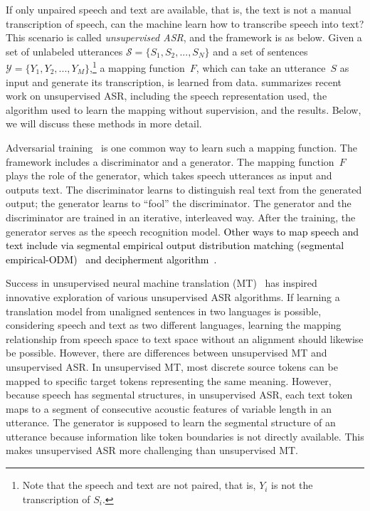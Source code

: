 If only unpaired speech and text are available, that is, the text is not a
manual transcription of speech, can the machine learn how to transcribe speech
into text?
This scenario is called \textit{unsupervised ASR}, and the framework is as
below. 
Given a set of unlabeled utterances $\mathcal{S}=\{S_1, S_2, ..., S_N\}$  and a
set of sentences $\mathcal{Y}=\{Y_1, Y_2, ..., Y_M\}$,\footnote{Note that
the speech and text are not paired, that is, $Y_i$ is not the transcription of
$S_i$.} a mapping function~$F$, which can take an utterance~$S$ as input and
generate its transcription, is learned from data. 
 summarizes recent work on unsupervised ASR,
including the speech representation used, the algorithm used to learn the
mapping without supervision, and the results. Below, we will discuss these
methods in more detail.


Adversarial training~\parencite{goodfellow_generative_2014,arjovsky_wasserstein_2017, gulrajani_improved_2017} is one common way to learn such a 
mapping function. 
The framework includes a discriminator and a generator.
The mapping function~$F$ plays the role of the generator, which takes speech utterances as input and outputs text.
The discriminator learns to distinguish real text from the generated
output; the generator learns to ``fool'' the discriminator.
The generator and the discriminator are trained in an iterative, 
interleaved way. 
After the training, the generator serves as the speech recognition model.
\textcolor{black}{
Other ways to map speech and text include via segmental empirical output distribution matching (segmental empirical-ODM)~\parencite{yeh_unsupervised_2019} and decipherment algorithm~\parencite{klejch_deciphering_2022}.}

Success in unsupervised neural machine translation
(MT)~\parencite{artetxe_unsupervised_2018, conneau_word_2018, lample_unsupervised_2018}
has inspired innovative exploration of various unsupervised ASR algorithms.
If learning a translation model from unaligned sentences in two languages is
possible, considering speech and text as two different languages, learning the
mapping relationship from speech space to text space without an alignment 
  should likewise be possible.   %
However, there are differences between unsupervised MT and unsupervised
ASR.
In unsupervised MT, most discrete source tokens can be mapped to specific
target tokens representing the same meaning. 
However, because speech has segmental structures, in unsupervised ASR, each text
token maps to a segment of consecutive acoustic features of variable length in
an utterance.
The generator is supposed to learn the segmental structure of an utterance
because information like token boundaries is not directly available.
This makes unsupervised ASR more challenging than unsupervised MT.

